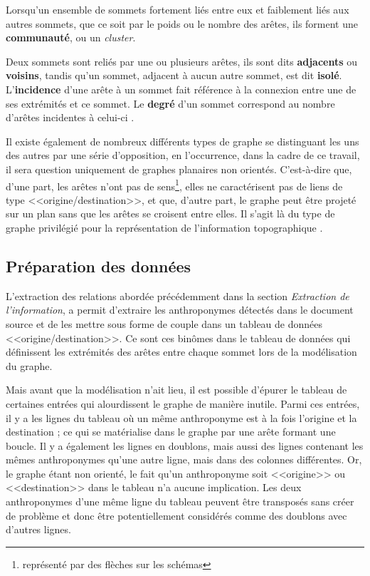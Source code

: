 Lorsqu'un ensemble de sommets fortement liés entre eux et faiblement liés aux autres sommets, que ce soit par le  poids ou le nombre  des arêtes, ils forment une \textbf{communauté}, ou un \textit{cluster}.

Deux sommets  sont reliés par une ou plusieurs arêtes, ils sont dits \textbf{adjacents} ou \textbf{voisins}, tandis qu'un sommet, adjacent à aucun autre sommet, est dit \textbf{isolé}. L'\textbf{incidence} d'une arête à un sommet fait référence à la connexion entre une de ses extrémités et ce sommet. Le \textbf{degré} d'un sommet correspond au nombre d'arêtes incidentes à celui-ci \parencite{beauguitte_graphes_2010,solnon_theorie_nodate}.

Il existe également de nombreux différents types de graphe se distinguant les uns des autres par une série d'opposition, en l'occurrence, dans la cadre de ce travail, il sera question uniquement de graphes planaires non orientés. C’est-à-dire que, d'une part, les arêtes n'ont pas de sens\footnote{représenté par des flèches sur les schémas}, elles ne caractérisent pas de liens de type <<origine/destination>>, et que, d'autre part, le graphe peut être projeté sur un plan sans que les arêtes se croisent entre elles. Il s'agit là du type de graphe privilégié pour la représentation de l'information topographique \parencite{beauguitte_graphes_2010}.

\subsection{Préparation des données}
L'extraction des relations abordée précédemment dans la section \textit{Extraction de l'information}, a permit d'extraire les anthroponymes détectés dans le document source et de les mettre sous forme de couple dans un tableau de données  <<origine/destination>>.
Ce sont ces binômes dans le tableau de données qui définissent les extrémités des arêtes entre chaque sommet lors de la modélisation du graphe.

Mais avant que la modélisation n'ait lieu, il est possible d'épurer le tableau de certaines entrées qui alourdissent le graphe de manière inutile. Parmi ces entrées, il y a les lignes du tableau où un même anthroponyme est à la fois l'origine et la destination ; ce qui se matérialise dans le graphe par une arête formant une boucle. Il y a également les lignes en doublons, mais aussi des lignes contenant les mêmes anthroponymes qu'une autre ligne, mais dans des colonnes différentes. Or, le graphe étant non orienté, le fait qu'un anthroponyme soit <<origine>> ou <<destination>> dans le tableau n'a aucune implication. Les deux anthroponymes d'une même ligne du tableau peuvent être transposés sans créer de problème et donc être potentiellement considérés comme des doublons avec d'autres lignes. 

